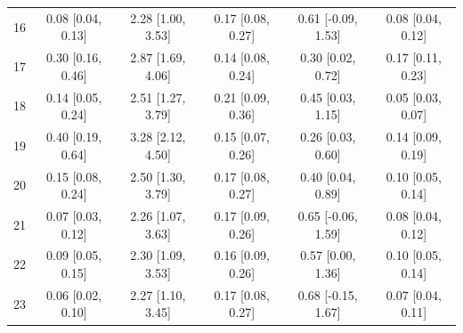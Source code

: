 \begin{table}
{\begin{tabular}{lccccc}
16 & 0.08 [0.04, 0.13] & 2.28 [1.00, 3.53] & 0.17 [0.08, 0.27] & 0.61 [-0.09, 1.53] & 0.08 [0.04, 0.12] \\
17 & 0.30 [0.16, 0.46] & 2.87 [1.69, 4.06] & 0.14 [0.08, 0.24] & 0.30 [0.02, 0.72] & 0.17 [0.11, 0.23] \\
18 & 0.14 [0.05, 0.24] & 2.51 [1.27, 3.79] & 0.21 [0.09, 0.36] & 0.45 [0.03, 1.15] & 0.05 [0.03, 0.07] \\
19 & 0.40 [0.19, 0.64] & 3.28 [2.12, 4.50] & 0.15 [0.07, 0.26] & 0.26 [0.03, 0.60] & 0.14 [0.09, 0.19] \\
20 & 0.15 [0.08, 0.24] & 2.50 [1.30, 3.79] & 0.17 [0.08, 0.27] & 0.40 [0.04, 0.89] & 0.10 [0.05, 0.14] \\
21 & 0.07 [0.03, 0.12] & 2.26 [1.07, 3.63] & 0.17 [0.09, 0.26] & 0.65 [-0.06, 1.59] & 0.08 [0.04, 0.12] \\
22 & 0.09 [0.05, 0.15] & 2.30 [1.09, 3.53] & 0.16 [0.09, 0.26] & 0.57 [0.00, 1.36] & 0.10 [0.05, 0.14] \\
23 & 0.06 [0.02, 0.10] & 2.27 [1.10, 3.45] & 0.17 [0.08, 0.27] & 0.68 [-0.15, 1.67] & 0.07 [0.04, 0.11] \\
\bottomrule
\end{tabular}
}
\end{table}